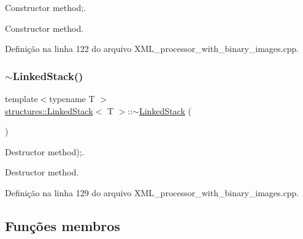 Constructor method;. 

Constructor method. 

Definição na linha 122 do arquivo X\+M\+L\+\_\+processor\+\_\+with\+\_\+binary\+\_\+images.\+cpp.


\begin{DoxyCode}{0}

\end{DoxyCode}
\mbox{\label{classstructures_1_1LinkedStack_aae17566eb103c92eb22be2e779286f2f}} 
\subsubsection{\texorpdfstring{$\sim$\+Linked\+Stack()}{~LinkedStack()}}
{\footnotesize\ttfamily template$<$typename T $>$ \\
\mbox{\hyperlink{classstructures_1_1LinkedStack}{structures\+::\+Linked\+Stack}}$<$ T $>$\+::$\sim$\mbox{\hyperlink{classstructures_1_1LinkedStack}{Linked\+Stack}} (\begin{DoxyParamCaption}{ }\end{DoxyParamCaption})}



Destructor method);. 

Destructor method. 

Definição na linha 129 do arquivo X\+M\+L\+\_\+processor\+\_\+with\+\_\+binary\+\_\+images.\+cpp.


\begin{DoxyCode}{0}

\end{DoxyCode}


\subsection{Funções membros}
\mbox{\label{classstructures_1_1LinkedStack_a56cc909b4a3a0ff7a589f35032ca0ba8}} 
